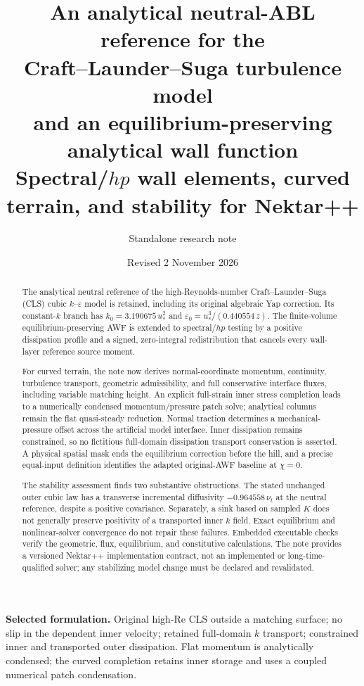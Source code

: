 \documentclass[11pt,a4paper]{article}
\title{\bfseries An analytical neutral-ABL reference for the\\
Craft--Launder--Suga turbulence model\\[3pt]
\large and an equilibrium-preserving analytical wall function\\[3pt]
\normalsize Spectral/$hp$ wall elements, curved terrain, and stability for Nektar++}
\author{Standalone research note}
\date{Revised 2 November 2026}
\numberwithin{equation}{section}
\newcommand{\eps}{\varepsilon}
\newcommand{\ust}{u_*}
\begin{document}
\maketitle
\begin{abstract}
The analytical neutral reference of the high-Reynolds-number
Craft--Launder--Suga (CLS) cubic $k$--$\eps$ model is retained,
including its original algebraic Yap correction. Its constant-$k$
branch has $k_0=3.190675\,\ust^2$ and
$\eps_0=\ust^3/(0.440554\,z)$. The finite-volume equilibrium-preserving
AWF is extended to spectral/$hp$ testing by a positive dissipation
profile and a signed, zero-integral redistribution that cancels every
wall-layer reference source moment.

For curved terrain, the note now derives normal-coordinate momentum,
continuity, turbulence transport, geometric admissibility, and full
conservative interface fluxes, including variable matching height.
An explicit full-strain inner stress completion leads to a numerically
condensed momentum/pressure patch solve; analytical columns remain
the flat quasi-steady reduction. Normal traction determines a
mechanical-pressure offset across the artificial model interface.
Inner dissipation remains constrained, so no fictitious full-domain
dissipation transport conservation is asserted. A physical spatial
mask ends the equilibrium correction before the hill, and a precise
equal-input definition identifies the adapted original-AWF baseline
at $\chi=0$.

The stability assessment finds two substantive obstructions. The
stated unchanged outer cubic law has a transverse incremental
diffusivity $-0.964558\,\nu_t$ at the neutral reference, despite a
positive covariance. Separately, a sink based on sampled $K$ does
not generally preserve positivity of a transported inner $k$ field.
Exact equilibrium and nonlinear-solver convergence do not repair
these failures. Embedded executable checks verify the geometric,
flux, equilibrium, and constitutive calculations. The note provides
a versioned Nektar++ implementation contract, not an implemented or
long-time-qualified solver; any stabilizing model change must be
declared and revalidated.
\end{abstract}
\vspace{3pt}
\textbf{Selected formulation.} Original high-Re CLS outside a matching
surface; no slip in the dependent inner velocity; retained full-domain
$k$ transport; constrained inner and transported outer dissipation.
Flat momentum is analytically condensed; the curved completion retains
inner storage and uses a coupled numerical patch condensation.
\end{document}
